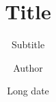 \documentclass[11pt]{beamer}
\title{Title}
\subtitle{Subtitle}
\author{Author}
\date[Short date]{Long date}
\institute[Institute initals]{Institute name}
\theoremstyle{definition} %
\theoremstyle{plain} %
\theoremstyle{remark} %
\begin{document}
\frame{\titlepage}
\begin{frame}
    \frametitle{}

\end{frame}





\begin{frame}
    \frametitle{}
\end{frame}
\end{document}
